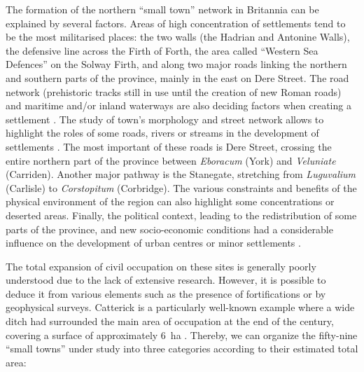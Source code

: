 The formation of the northern “small town” network in Britannia can be explained by several factors. Areas of high concentration of settlements tend to be the most militarised places: the two walls (the Hadrian and Antonine Walls), the defensive line across the Firth of Forth, the area called “Western Sea Defences” on the Solway Firth, and along two major roads linking the northern and southern parts of the province, mainly in the east on Dere Street. The road network (prehistoric tracks still in use until the creation of new Roman roads) and maritime and/or inland waterways are also deciding factors when creating a settlement \parencite[256]{Mattingly_2006}. The study of town’s morphology and street network allows to highlight the roles of some roads, rivers or streams in the development of settlements \parencite[203]{Petit_1994a}. The most important of these roads is Dere Street, crossing the entire northern part of the province between \textit{Eboracum} (York) and \textit{Veluniate} (Carriden). Another major pathway is the Stanegate, stretching from \textit{Luguvalium} (Carlisle) to \textit{Corstopitum} (Corbridge). The various constraints and benefits of the physical environment of the region can also highlight some concentrations or deserted areas. Finally, the political context, leading to the redistribution of some parts of the province, and new socio-economic conditions had a considerable influence on the development of urban centres or minor settlements \parencites[11]{Branigan_1980}[12]{Burnham_1990}.


The  total expansion of civil occupation on these sites is generally poorly understood due to the lack of extensive research. However, it is possible to deduce it from various elements such as the presence of fortifications or by geophysical surveys. Catterick is a particularly well-known example where a wide ditch had surrounded the main area of occupation at the end of the  century\AD, covering a surface of approximately \SI{6}{\hectare} \parencite[57]{Hartley_1988}. Thereby, we can organize the fifty-nine “small towns” under study into three categories according to their estimated total area:

